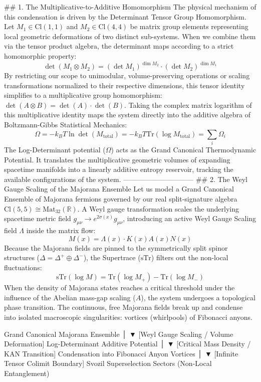 ## 1. The Multiplicative-to-Additive Homomorphism
The physical mechanism of this condensation is driven by the Determinant Tensor Group Homomorphism. Let $M_1 \in \text{Cl}(1,1)$ and $M_2 \in \text{Cl}(4,4)$ be matrix group elements representing local geometric deformations of two distinct sub-systems. When we combine them via the tensor product algebra, the determinant maps according to a strict homomorphic property:
$$\det(M_1 \otimes M_2) = (\det M_1)^{\dim M_2} \cdot (\det M_2)^{\dim M_1}$$ 
By restricting our scope to unimodular, volume-preserving operations or scaling transformations normalized to their respective dimensions, this tensor identity simplifies to a multiplicative group homomorphism: $\det(A \otimes B) = \det(A) \cdot \det(B)$.
Taking the complex matrix logarithm of this multiplicative identity maps the system directly into the additive algebra of Boltzmann-Gibbs Statistical Mechanics:
$$\Omega = -k_B T \ln \det(M_{\text{total}}) = -k_B T \text{Tr}(\log M_{\text{total}}) = \sum_{i} \Omega_i$$ 
The Log-Determinant potential ($\Omega$) acts as the Grand Canonical Thermodynamic Potential. It translates the multiplicative geometric volumes of expanding spacetime manifolds into a linearly additive entropy reservoir, tracking the available configurations of the system.
------------------------------
## 2. The Weyl Gauge Scaling of the Majorana Ensemble
Let us model a Grand Canonical Ensemble of Majorana fermions governed by our real split-signature algebra $\text{Cl}(5,5) \cong \text{Mat}_{32}(\mathbb{R})$. A Weyl gauge transformation scales the underlying spacetime metric field $g_{\mu\nu} \to e^{2\sigma(x)} g_{\mu\nu}$, introducing an active Weyl Gauge Scaling field $\Lambda$ inside the matrix flow:
$$M(x) = \Lambda(x) \cdot K(x) A(x) N(x)$$ 
Because the Majorana fields are pinned to the symmetrically split spinor structures ($\Delta = \Delta^+ \oplus \Delta^-$), the Supertrace ($\text{sTr}$) filters out the non-local fluctuations:
$$\text{sTr}(\log M) = \text{Tr}(\log M_+) - \text{Tr}(\log M_-)$$ 
When the density of Majorana states reaches a critical threshold under the influence of the Abelian mass-gap scaling ($A$), the system undergoes a topological phase transition. The continuous, free Majorana fields break up and condense into isolated macroscopic singularities: vortices (whirlpools) of Fibonacci anyons.

    Grand Canonical Majorana Ensemble
                   │
                   ▼  [Weyl Gauge Scaling / Volume Deformation]
       Log-Determinant Additive Potential
                   │
                   ▼  [Critical Mass Density / KAN Transition]
    Condensation into Fibonacci Anyon Vortices
                   │
                   ▼  [Infinite Tensor Colimit Boundary]
    Svozil Superselection Sectors (Non-Local Entanglement)

